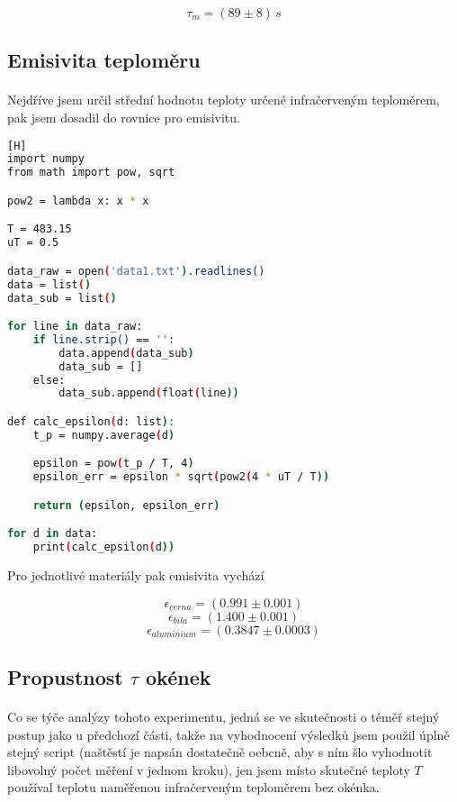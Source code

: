 \documentclass[a4paper,11pt]{article}
\begin{document}
        $$ \tau_{m} = \left(89 \pm 8\right) \, s$$

    \subsection{Emisivita teploměru}

        \paragraph{} Nejdříve jsem určil střední hodnotu teploty určené infračerveným
        teploměrem, pak jsem dosadil do rovnice pro emisivitu.

\begin{lstlisting}[language=Bash][H]
import numpy
from math import pow, sqrt

pow2 = lambda x: x * x

T = 483.15
uT = 0.5

data_raw = open('data1.txt').readlines()
data = list()
data_sub = list()

for line in data_raw:
    if line.strip() == '':
        data.append(data_sub)
        data_sub = []
    else:
        data_sub.append(float(line))

def calc_epsilon(d: list):
    t_p = numpy.average(d)

    epsilon = pow(t_p / T, 4)
    epsilon_err = epsilon * sqrt(pow2(4 * uT / T))

    return (epsilon, epsilon_err)

for d in data:
    print(calc_epsilon(d))\end{lstlisting}

    Pro jednotlivé materiály pak emisivita vychází

    $$ \epsilon_{cerna} = \left(0.991 \pm 0.001\right)$$
    $$ \epsilon_{bila} = \left(1.400 \pm 0.001\right)$$
    $$ \epsilon_{aluminium} = \left(0.3847 \pm 0.0003\right)$$

    \subsection{Propustnost $\tau$ okének}

        \paragraph{} Co se týče analýzy tohoto experimentu, jedná se ve skutečnosti
        o téměř stejný postup jako u předchozí části, takže na vyhodnocení výsledků
        jsem použil úplně stejný script (naštěstí je napsán dostatečně oebcně, aby s ním
        šlo vyhodnotit libovolný počet měření v jednom kroku), jen jsem místo skutečné
        teploty $T$ používal teplotu naměřenou infračerveným teploměrem bez okénka.
\end{document}
